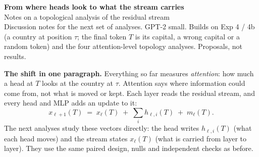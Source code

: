 \documentclass[10pt]{article}
\begin{document}
{\LARGE\bfseries From where heads look to what the stream carries}\\[2pt]
{\large Notes on a topological analysis of the residual stream}\\[2pt]
{\small\color{muted} Discussion notes for the next set of analyses. GPT-2 small. Builds on Exp 4 / 4b (a country at
position $\tau$; the final token $T$ is its capital, a wrong capital or a random token) and the four attention-level
topology analyses. Proposals, not results.}

\vspace{6pt}
\colorbox{plane}{\parbox{\dimexpr\linewidth-2\fboxsep}{\small
\textbf{The shift in one paragraph.} Everything so far measures \emph{attention}: how much a head at $T$ looks at the
country at $\tau$. Attention says where information could come from, not what is moved or kept. Each layer reads the
residual stream, and every head and MLP adds an update to it:
\[ x_{\ell+1}(T) \;=\; x_\ell(T) \;+\; \textstyle\sum_i h_{\ell,i}(T) \;+\; m_\ell(T). \]
The next analyses study these vectors directly: the head writes $h_{\ell,i}(T)$ (what each head moves) and the stream
states $x_\ell(T)$ (what is carried from layer to layer). They use the same paired design, nulls and independent checks
as before.}}

\vspace{6pt}
\begin{center}
\end{center}
\end{document}
